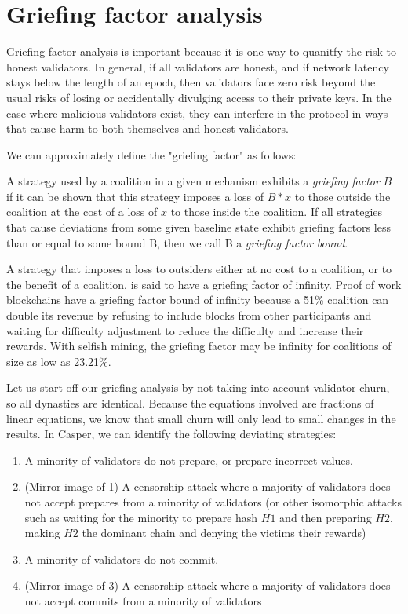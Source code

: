 \documentclass[12pt]{article}
\begin{document}
\section{Griefing factor analysis}

Griefing factor analysis is important because it is one way to quanitfy the risk to honest validators. In general, if all validators are honest, and if network latency stays below the length of an epoch, then validators face zero risk beyond the usual risks of losing or accidentally divulging access to their private keys. In the case where malicious validators exist, they can interfere in the protocol in ways that cause harm to both themselves and honest validators.

We can approximately define the "griefing factor" as follows:

A strategy used by a coalition in a given mechanism exhibits a \textit{griefing factor} $B$ if it can be shown that this strategy imposes a loss of $B * x$ to those outside the coalition at the cost of a loss of $x$ to those inside the coalition. If all strategies that cause deviations from some given baseline state exhibit griefing factors less than or equal to some bound B, then we call B a \textit{griefing factor bound}.

A strategy that imposes a loss to outsiders either at no cost to a coalition, or to the benefit of a coalition, is said to have a griefing factor of infinity. Proof of work blockchains have a griefing factor bound of infinity because a 51\% coalition can double its revenue by refusing to include blocks from other participants and waiting for difficulty adjustment to reduce the difficulty and increase their rewards. With selfish mining, the griefing factor may be infinity for coalitions of size as low as 23.21\%.

Let us start off our griefing analysis by not taking into account validator churn, so all dynasties are identical. Because the equations involved are fractions of linear equations, we know that small churn will only lead to small changes in the results. In Casper, we can identify the following deviating strategies:

\begin{enumerate}
\item A minority of validators do not prepare, or prepare incorrect values.
\item (Mirror image of 1) A censorship attack where a majority of validators does not accept prepares from a minority of validators (or other isomorphic attacks such as waiting for the minority to prepare hash $H1$ and then preparing $H2$, making $H2$ the dominant chain and denying the victims their rewards)
\item A minority of validators do not commit.
\item (Mirror image of 3) A censorship attack where a majority of validators does not accept commits from a minority of validators
\end{enumerate}
\end{document}
